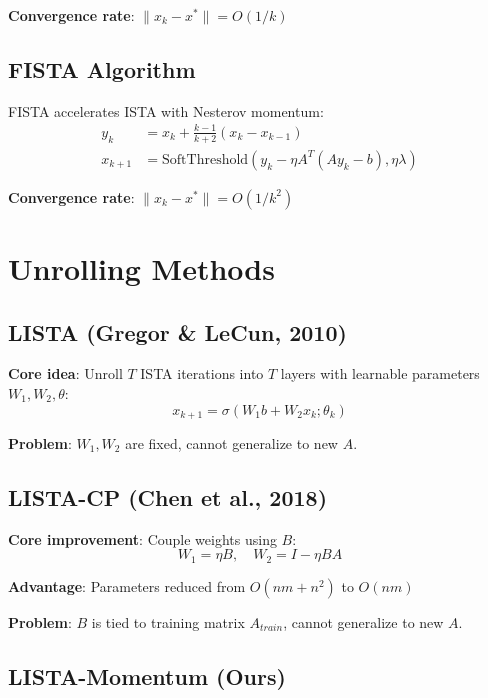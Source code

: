 \documentclass[11pt,a4paper]{article}
\begin{document}
\textbf{Convergence rate}: $\|x_k - x^*\| = O(1/k)$

\subsection{FISTA Algorithm}

FISTA accelerates ISTA with Nesterov momentum:
\begin{align}
    y_k &= x_k + \frac{k-1}{k+2}(x_k - x_{k-1}) \\
    x_{k+1} &= \text{SoftThreshold}(y_k - \eta A^T(Ay_k - b), \eta\lambda)
\end{align}

\textbf{Convergence rate}: $\|x_k - x^*\| = O(1/k^2)$

\section{Unrolling Methods}
\label{sec:methods}

\subsection{LISTA (Gregor \& LeCun, 2010)}

\textbf{Core idea}: Unroll $T$ ISTA iterations into $T$ layers with learnable parameters $W_1, W_2, \theta$:
\begin{equation}
    x_{k+1} = \sigma(W_1 b + W_2 x_k; \theta_k)
\end{equation}

\textbf{Problem}: $W_1, W_2$ are fixed, cannot generalize to new $A$.

\subsection{LISTA-CP (Chen et al., 2018)}

\textbf{Core improvement}: Couple weights using $B$:
\begin{equation}
    W_1 = \eta B, \quad W_2 = I - \eta BA
\end{equation}

\textbf{Advantage}: Parameters reduced from $O(nm + n^2)$ to $O(nm)$

\textbf{Problem}: $B$ is tied to training matrix $A_{train}$, cannot generalize to new $A$.

\subsection{LISTA-Momentum (Ours)}
\end{document}
